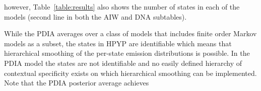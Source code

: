  however, Table~\ref{table:results} also shows the number of states in each of the models (second line in both the AIW and DNA subtables).

While the PDIA averages over a  class of models that includes finite order Markov models as a subset, the states in HPYP are identifiable which means that hierarchical smoothing of the per-state emission distributions is possible.  In the PDIA model the states are not identifiable and no easily defined hierarchy of contextual specificity exists on which hierarchical smoothing can be implemented.   Note that the PDIA posterior average achieves


\begin{figure}[htbp]
\centering
{}
\\
\caption{}
\label{fig:aiw_and_dna_all_figs}
\end{figure}
